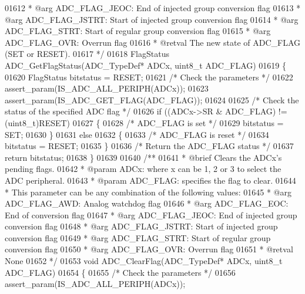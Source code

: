 \begin{DoxyCode}
01612 \textcolor{comment}{  *            @arg ADC\_FLAG\_JEOC: End of injected group conversion flag}
01613 \textcolor{comment}{  *            @arg ADC\_FLAG\_JSTRT: Start of injected group conversion flag}
01614 \textcolor{comment}{  *            @arg ADC\_FLAG\_STRT: Start of regular group conversion flag}
01615 \textcolor{comment}{  *            @arg ADC\_FLAG\_OVR: Overrun flag                                                 }
01616 \textcolor{comment}{  * @retval The new state of ADC\_FLAG (SET or RESET).}
01617 \textcolor{comment}{  */}
01618 FlagStatus ADC_GetFlagStatus(ADC\_TypeDef* ADCx, uint8\_t ADC\_FLAG)
01619 \{
01620   FlagStatus bitstatus = RESET;
01621   \textcolor{comment}{/* Check the parameters */}
01622   assert_param(IS\_ADC\_ALL\_PERIPH(ADCx));
01623   assert_param(IS\_ADC\_GET\_FLAG(ADC\_FLAG));
01624 
01625   \textcolor{comment}{/* Check the status of the specified ADC flag */}
01626   \textcolor{keywordflow}{if} ((ADCx->SR & ADC\_FLAG) != (uint8\_t)RESET)
01627   \{
01628     \textcolor{comment}{/* ADC\_FLAG is set */}
01629     bitstatus = SET;
01630   \}
01631   \textcolor{keywordflow}{else}
01632   \{
01633     \textcolor{comment}{/* ADC\_FLAG is reset */}
01634     bitstatus = RESET;
01635   \}
01636   \textcolor{comment}{/* Return the ADC\_FLAG status */}
01637   \textcolor{keywordflow}{return}  bitstatus;
01638 \}
01639 
01640 \textcolor{comment}{/**}
01641 \textcolor{comment}{  * @brief  Clears the ADCx's pending flags.}
01642 \textcolor{comment}{  * @param  ADCx: where x can be 1, 2 or 3 to select the ADC peripheral.}
01643 \textcolor{comment}{  * @param  ADC\_FLAG: specifies the flag to clear. }
01644 \textcolor{comment}{  *          This parameter can be any combination of the following values:}
01645 \textcolor{comment}{  *            @arg ADC\_FLAG\_AWD: Analog watchdog flag}
01646 \textcolor{comment}{  *            @arg ADC\_FLAG\_EOC: End of conversion flag}
01647 \textcolor{comment}{  *            @arg ADC\_FLAG\_JEOC: End of injected group conversion flag}
01648 \textcolor{comment}{  *            @arg ADC\_FLAG\_JSTRT: Start of injected group conversion flag}
01649 \textcolor{comment}{  *            @arg ADC\_FLAG\_STRT: Start of regular group conversion flag}
01650 \textcolor{comment}{  *            @arg ADC\_FLAG\_OVR: Overrun flag                          }
01651 \textcolor{comment}{  * @retval None}
01652 \textcolor{comment}{  */}
01653 \textcolor{keywordtype}{void} ADC_ClearFlag(ADC\_TypeDef* ADCx, uint8\_t ADC\_FLAG)
01654 \{
01655   \textcolor{comment}{/* Check the parameters */}
01656   assert_param(IS\_ADC\_ALL\_PERIPH(ADCx));

\end{DoxyCode}
